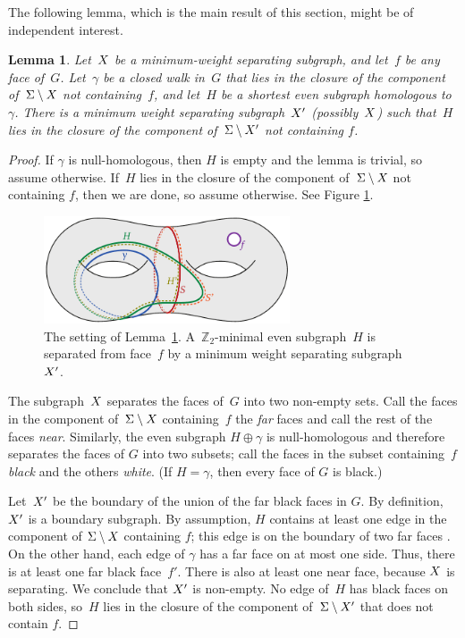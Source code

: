 \documentclass[11pt,twoside]{article}
\def\Z{\mathbb{Z}}
\newtheorem{lemma}[theorem]{Lemma}
\begin{document}
{The following lemma, which is the main result of this section, might be of independent interest.  


\begin{lemma}
\label{lem:global_split-nocross}
Let~$X$ be a minimum-weight separating subgraph, and let~$f$ be any face of~$G$.
Let~$\gamma$ be a closed walk in~$G$ that lies in the closure of the component of~$\Sigma \setminus X$ not containing~$f$, and let~$H$
be a shortest even subgraph homologous to~$\gamma$.
There is a minimum weight separating subgraph~$X'$ (possibly~$X$) such
that~$H$ lies in the closure of the component of~$\Sigma \setminus X'$ not containing $f$. 
\end{lemma}

\begin{proof}
If $\gamma$ is null-homologous, then $H$ is empty and the lemma is trivial, so assume otherwise.  If~$H$ lies in the closure of the component of~$\Sigma \setminus X$ not containing $f$, then we are done, so assume otherwise.  See Figure \ref{fig:global_nonsep-vs-shortsep}. 

\begin{figure}[ht]
\centering
\includegraphics[height=1.25in]{Fig/nonsep-vs-shortsep-2}
\caption{The setting of Lemma~\ref{lem:global_split-nocross}. A~$\Z_2$-minimal even subgraph~$H$ is separated from face~$f$ by a minimum weight separating subgraph~$X'$.}
\label{fig:global_nonsep-vs-shortsep}
\end{figure}

The subgraph~$X$ separates the faces of~$G$ into two non-empty sets.  Call the faces in the component of~$\Sigma \setminus X$ containing~$f$ the \emph{far} faces and call the rest of the faces  \emph{near}.  Similarly, the even subgraph $H \oplus \gamma$ is null-homologous and therefore separates the faces of $G$ into two subsets; call the faces in the subset containing~$f$ \emph{black} and the others \emph{white}.  (If $H = \gamma$, then every face of $G$ is black.)

Let~$X'$ be the boundary of the union of the far black faces in $G$.
By definition,~$X'$ is a boundary subgraph.  By assumption, $H$ contains at least one edge in the component of $\Sigma\setminus X$ containing $f$; this edge is on the boundary of two far faces .  On the other hand, each edge of $\gamma$ has a far face on at most one side.  Thus, there is at least one far black face~$f'$.  There is also at least one near face, because $X$ is separating.  We conclude that $X'$ is non-empty.  No edge of~$H$ has black faces on both sides, so~$H$ lies in the closure of the  component of~$\Sigma \setminus X'$ that does not contain $f$.


\end{proof}}
\end{document}
